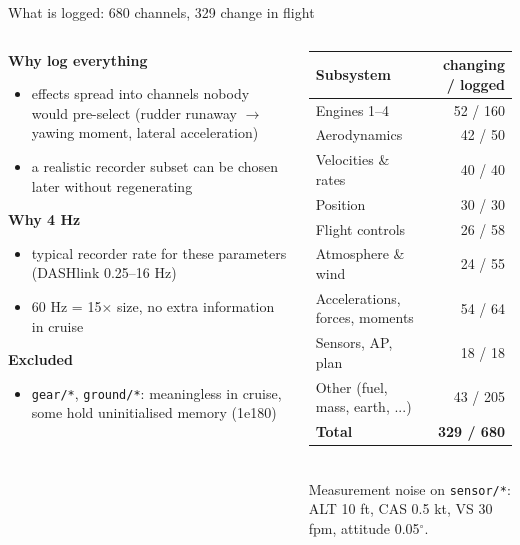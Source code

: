 \documentclass[aspectratio=169,11pt]{beamer}
\newcommand{\aside}[1]{{\color{muted}\small #1}}
\begin{document}
\begin{frame}{What is logged: 680 channels, 329 change in flight}
  \begin{columns}[T]
    \begin{column}{0.5\textwidth}
      \small
      \textbf{Why log everything}
      \begin{itemize}\footnotesize
        \item effects spread into channels nobody would pre-select (rudder runaway $\rightarrow$ yawing moment, lateral acceleration)
        \item a realistic recorder subset can be chosen later without regenerating
      \end{itemize}
      \textbf{Why 4 Hz}
      \begin{itemize}\footnotesize
        \item typical recorder rate for these parameters (DASHlink 0.25--16 Hz)
        \item 60 Hz = 15$\times$ size, no extra information in cruise
      \end{itemize}
      \textbf{Excluded}
      \begin{itemize}\footnotesize
        \item \texttt{gear/*}, \texttt{ground/*}: meaningless in cruise, some hold uninitialised memory (1e180)
      \end{itemize}
    \end{column}
    \begin{column}{0.47\textwidth}
      \footnotesize
      \begin{tabularx}{\linewidth}{@{}L r@{}}
        \toprule
        Subsystem & changing / logged \\
        \midrule
        Engines 1--4 & 52 / 160 \\
        Aerodynamics & 42 / 50 \\
        Velocities \& rates & 40 / 40 \\
        Position & 30 / 30 \\
        Flight controls & 26 / 58 \\
        Atmosphere \& wind & 24 / 55 \\
        Accelerations, forces, moments & 54 / 64 \\
        Sensors, AP, plan & 18 / 18 \\
        Other (fuel, mass, earth, ...) & 43 / 205 \\
        \midrule
        \textbf{Total} & \textbf{329 / 680} \\
        \bottomrule
      \end{tabularx}\\[0.4em]
      \aside{Measurement noise on \texttt{sensor/*}: ALT 10 ft, CAS 0.5 kt, VS 30 fpm, attitude 0.05$^\circ$.}
    \end{column}
  \end{columns}
\end{frame}
\end{document}
